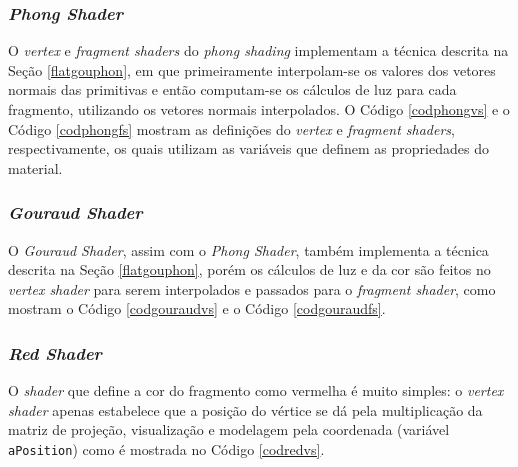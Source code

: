 \subsubsection{\textit{Phong Shader}}

	O \textit{vertex} e \textit{fragment shaders} do \textit{phong shading} implementam a técnica descrita na Seção \ref{flatgouphon}, em que primeiramente interpolam-se os valores dos vetores normais das primitivas e então computam-se os cálculos de luz para cada fragmento, utilizando os vetores normais interpolados. O Código \ref{codphongvs} e o Código \ref{codphongfs} mostram as definições do \textit{vertex} e \textit{fragment shaders}, respectivamente, os quais utilizam as variáveis que definem as propriedades do material.  

	

	

\subsubsection{\textit{Gouraud Shader}}

	O \textit{Gouraud Shader}, assim com o \textit{Phong Shader}, também implementa a técnica descrita na Seção \ref{flatgouphon}, porém os cálculos de luz e da cor são feitos no \textit{vertex shader} para serem interpolados e passados para o \textit{fragment shader}, como mostram o Código \ref{codgouraudvs} e o Código \ref{codgouraudfs}. 

	

	
	
\subsubsection{\textit{Red Shader}}
	
	O \textit{shader} que define a cor do fragmento como vermelha é muito simples:  o \textit{vertex shader} apenas estabelece que a posição do vértice  se dá pela multiplicação da matriz de projeção, visualização e modelagem pela coordenada (variável \texttt{aPosition}) como é mostrada no Código \ref{codredvs}. 
	
